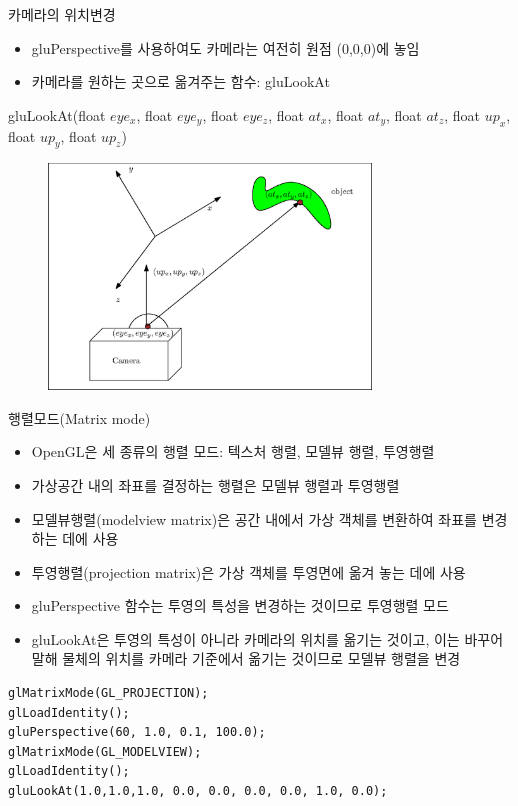 \documentclass{beamer}
\begin{document}
\begin{frame}[fragile]{카메라의 위치변경}

\begin{itemize}
\item {\sf gluPerspective}를 사용하여도 카메라는 여전히 원점 (0,0,0)에 놓임
\item 카메라를 원하는 곳으로 옮겨주는 함수: {\sf gluLookAt}
\end{itemize}

{\tiny gluLookAt(float $eye_x$, float $eye_y$, float $eye_z$,  float $at_x$, float $at_y$, float $at_z$,  float $up_x$, float $up_y$, float $up_z$)}

\begin{figure}[h!]
  \centering
    \includegraphics[height=6cm]{OGL_camera/cameraPositioning.eps}
\end{figure}

\end{frame}

\begin{frame}[fragile]{행렬모드(Matrix mode)}

{\small
\begin{itemize}
\item OpenGL은 세 종류의 행렬 모드: 텍스처 행렬, 모델뷰 행렬, 투영행렬
\item 가상공간 내의 좌표를 결정하는 행렬은 모델뷰 행렬과 투영행렬
\item 모델뷰행렬(modelview matrix)은 공간 내에서 가상 객체를 변환하여 좌표를 변경하는 데에 사용
\item 투영행렬(projection matrix)은 가상 객체를 투영면에 옮겨 놓는 데에 사용
\item {\sf gluPerspective} 함수는 투영의 특성을 변경하는 것이므로 투영행렬 모드
\item {\sf gluLookAt}은 투영의 특성이 아니라 카메라의 위치를 옮기는 것이고, 이는 바꾸어 말해 물체의 위치를 카메라 기준에서 옮기는 것이므로 모델뷰 행렬을 변경
\end{itemize}


\begin{verbatim}
glMatrixMode(GL_PROJECTION);
glLoadIdentity();
gluPerspective(60, 1.0, 0.1, 100.0);
glMatrixMode(GL_MODELVIEW);
glLoadIdentity();
gluLookAt(1.0,1.0,1.0, 0.0, 0.0, 0.0, 0.0, 1.0, 0.0);
\end{verbatim}
}

\end{frame}
\end{document}
